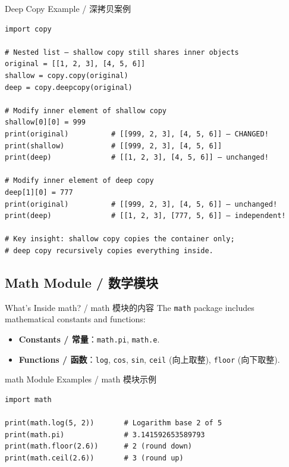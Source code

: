 \documentclass[11pt,a4paper]{report}
\let\oldtexttt\texttt
\renewcommand{\texttt}[1]{\textcolor{mainblue}{\oldtexttt{#1}}}
\begin{document}
\begin{examplebox}{Deep Copy Example / 深拷贝案例}
\begin{lstlisting}
import copy

# Nested list — shallow copy still shares inner objects
original = [[1, 2, 3], [4, 5, 6]]
shallow = copy.copy(original)
deep = copy.deepcopy(original)

# Modify inner element of shallow copy
shallow[0][0] = 999
print(original)          # [[999, 2, 3], [4, 5, 6]] — CHANGED!
print(shallow)           # [[999, 2, 3], [4, 5, 6]]
print(deep)              # [[1, 2, 3], [4, 5, 6]] — unchanged!

# Modify inner element of deep copy
deep[1][0] = 777
print(original)          # [[999, 2, 3], [4, 5, 6]] — unchanged!
print(deep)              # [[1, 2, 3], [777, 5, 6]] — independent!

# Key insight: shallow copy copies the container only;
# deep copy recursively copies everything inside.
\end{lstlisting}
\end{examplebox}

\subsection{Math Module / 数学模块}

\begin{concept}{What's Inside math? / math 模块的内容}
    The \texttt{math} package includes mathematical constants and functions:
    \begin{itemize}[itemsep=0.3em]
        \item \textbf{Constants / 常量}：\texttt{math.pi}, \texttt{math.e}.
        \item \textbf{Functions / 函数}：\texttt{log}, \texttt{cos}, \texttt{sin}, \texttt{ceil} (向上取整), \texttt{floor} (向下取整).
    \end{itemize}
\end{concept}

\begin{examplebox}{math Module Examples / math 模块示例}
\begin{lstlisting}
import math

print(math.log(5, 2))       # Logarithm base 2 of 5
print(math.pi)              # 3.141592653589793
print(math.floor(2.6))      # 2 (round down)
print(math.ceil(2.6))       # 3 (round up)
\end{lstlisting}
\end{examplebox}
\end{document}
